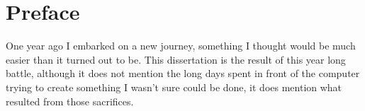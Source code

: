 \chapter*{Preface}

One year ago I embarked on a new journey, something I thought would be much easier than it turned out to be. This dissertation is the result of this year long battle, although it does not mention the long days spent in front of the computer trying to create something I wasn't sure could be done, it does mention what resulted from those sacrifices.